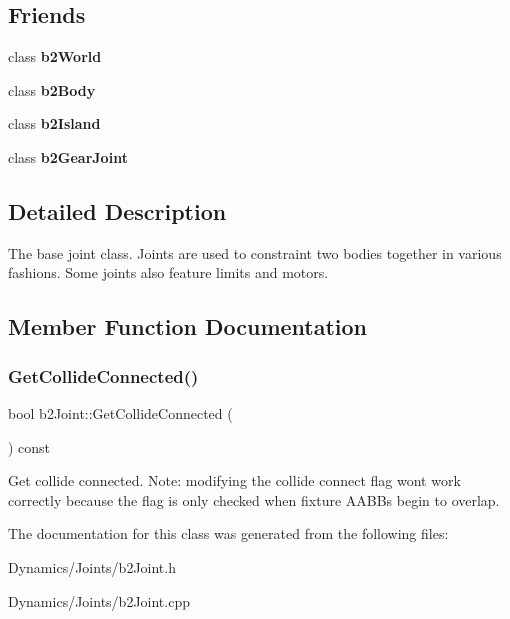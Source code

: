 \subsection*{Friends}
\begin{DoxyCompactItemize}
\item 
\mbox{\label{classb2Joint_a4bd536c5a7c0587913765bbc2693ceea}} 
class {\bfseries b2\+World}
\item 
\mbox{\label{classb2Joint_a010ab52de250e5fe30a45d642f46405b}} 
class {\bfseries b2\+Body}
\item 
\mbox{\label{classb2Joint_afc682950b8c4f251804fc1938663098b}} 
class {\bfseries b2\+Island}
\item 
\mbox{\label{classb2Joint_a13c275221e30bb485e17e4e04553cb71}} 
class {\bfseries b2\+Gear\+Joint}
\end{DoxyCompactItemize}


\subsection{Detailed Description}
The base joint class. Joints are used to constraint two bodies together in various fashions. Some joints also feature limits and motors. 

\subsection{Member Function Documentation}
\mbox{\label{classb2Joint_a48492903df96c8a7b8cad8ed826f8cb0}} 
\subsubsection{\texorpdfstring{Get\+Collide\+Connected()}{GetCollideConnected()}}
{\footnotesize\ttfamily bool b2\+Joint\+::\+Get\+Collide\+Connected (\begin{DoxyParamCaption}{ }\end{DoxyParamCaption}) const\hspace{0.3cm}{\ttfamily [inline]}}

Get collide connected. Note\+: modifying the collide connect flag won\textquotesingle{}t work correctly because the flag is only checked when fixture A\+A\+B\+Bs begin to overlap. 

The documentation for this class was generated from the following files\+:\begin{DoxyCompactItemize}
\item 
Dynamics/\+Joints/b2\+Joint.\+h\item 
Dynamics/\+Joints/b2\+Joint.\+cpp\end{DoxyCompactItemize}
